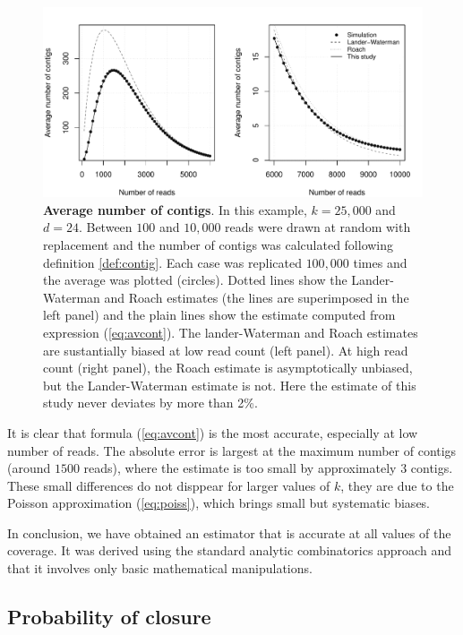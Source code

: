 \documentclass{article}
\begin{document}
\begin{figure}[h]
\centering
\includegraphics[scale=0.585]{Fig3.pdf}
\caption{\textbf{Average number of contigs}. In this example, $k=25,000$
and $d=24$. Between $100$ and $10,000$ reads were drawn at random with
replacement and the number of contigs was calculated following definition
\ref{def:contig}. Each case was replicated $100,000$ times and the average
was plotted (circles). Dotted lines show the Lander-Waterman and Roach
estimates (the lines are superimposed in the left panel) and the plain
lines show the estimate computed from expression (\ref{eq:avcont}).
The lander-Waterman and Roach estimates are sustantially biased at low
read count (left panel). At high read count (right panel), the Roach
estimate is asymptotically unbiased, but the Lander-Waterman estimate is
not. Here the estimate of this study never deviates by more than 2\%.}
\label{fig:avcontig}
\end{figure}

It is clear that formula (\ref{eq:avcont}) is the most accurate,
especially at low number of reads. The absolute error is largest at the
maximum number of contigs (around $1500$ reads), where the estimate is too
small by approximately $3$ contigs. These small differences do not
disppear for larger values of $k$, they are due to the Poisson
approximation (\ref{eq:poiss}), which brings small but systematic biases.

In conclusion, we have obtained an estimator that is accurate at all
values of the coverage. It was derived using the standard analytic
combinatorics approach and that it involves only basic mathematical
manipulations.





\subsection{Probability of closure}
\label{subsec:closure}
\end{document}
